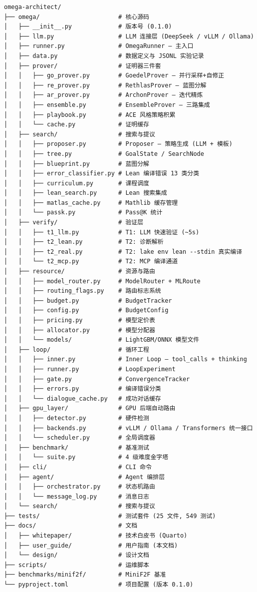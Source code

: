 \documentclass[
  11pt,
  a4paper,
]{ctexrep}
\begin{document}
\begin{verbatim}
omega-architect/
├── omega/                      # 核心源码
│   ├── __init__.py             # 版本号 (0.1.0)
│   ├── llm.py                  # LLM 连接层 (DeepSeek / vLLM / Ollama)
│   ├── runner.py               # OmegaRunner — 主入口
│   ├── data.py                 # 数据定义与 JSONL 实验记录
│   ├── prover/                 # 证明器三件套
│   │   ├── go_prover.py        # GoedelProver — 并行采样+自修正
│   │   ├── re_prover.py        # RethlasProver — 蓝图分解
│   │   ├── ar_prover.py        # ArchonProver — 迭代精炼
│   │   ├── ensemble.py         # EnsembleProver — 三路集成
│   │   ├── playbook.py         # ACE 风格策略积累
│   │   └── cache.py            # 证明缓存
│   ├── search/                 # 搜索与提议
│   │   ├── proposer.py         # Proposer — 策略生成 (LLM + 模板)
│   │   ├── tree.py             # GoalState / SearchNode
│   │   ├── blueprint.py        # 蓝图分解
│   │   ├── error_classifier.py # Lean 编译错误 13 类分类
│   │   ├── curriculum.py       # 课程调度
│   │   ├── lean_search.py      # Lean 搜索集成
│   │   ├── matlas_cache.py     # Mathlib 缓存管理
│   │   └── passk.py            # Pass@K 统计
│   ├── verify/                 # 验证层
│   │   ├── t1_llm.py           # T1: LLM 快速验证 (~5s)
│   │   ├── t2_lean.py          # T2: 诊断解析
│   │   ├── t2_real.py          # T2: lake env lean --stdin 真实编译
│   │   └── t2_mcp.py           # T2: MCP 编译通道
│   ├── resource/               # 资源与路由
│   │   ├── model_router.py     # ModelRouter + MLRoute
│   │   ├── routing_flags.py    # 路由标志系统
│   │   ├── budget.py           # BudgetTracker
│   │   ├── config.py           # BudgetConfig
│   │   ├── pricing.py          # 模型定价表
│   │   ├── allocator.py        # 模型分配器
│   │   └── models/             # LightGBM/ONNX 模型文件
│   ├── loop/                   # 循环工程
│   │   ├── inner.py            # Inner Loop — tool_calls + thinking
│   │   ├── runner.py           # LoopExperiment
│   │   ├── gate.py             # ConvergenceTracker
│   │   ├── errors.py           # 编译错误分类
│   │   └── dialogue_cache.py   # 成功对话缓存
│   ├── gpu_layer/              # GPU 后端自动路由
│   │   ├── detector.py         # 硬件检测
│   │   ├── backends.py         # vLLM / Ollama / Transformers 统一接口
│   │   └── scheduler.py        # 全局调度器
│   ├── benchmark/              # 基准测试
│   │   └── suite.py            # 4 级难度金字塔
│   ├── cli/                    # CLI 命令
│   ├── agent/                  # Agent 编排层
│   │   ├── orchestrator.py     # 状态机路由
│   │   └── message_log.py      # 消息日志
│   └── search/                 # 搜索与提议
├── tests/                      # 测试套件 (25 文件, 549 测试)
├── docs/                       # 文档
│   ├── whitepaper/             # 技术白皮书 (Quarto)
│   ├── user_guide/             # 用户指南 (本文档)
│   └── design/                 # 设计文档
├── scripts/                    # 运维脚本
├── benchmarks/minif2f/         # MiniF2F 基准
└── pyproject.toml              # 项目配置 (版本 0.1.0)
\end{verbatim}
\end{document}
